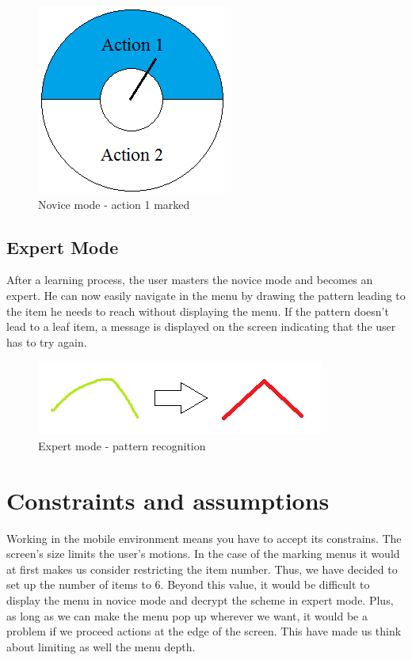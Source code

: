 \documentclass[conference]{IEEEtran}
\begin{document}
\begin{figure}[!ht] 
		\centering
		\includegraphics[scale = 0.5]{figure2.png} %
		\caption{Novice mode - action 1 marked}
		\label{linear-marking_menus}
\end{figure}

\subsection{Expert Mode}
After a learning process, the user masters the novice mode and becomes an expert. He can now easily navigate in the menu by drawing the pattern leading to the item he needs to reach without displaying the menu. If the pattern doesn't lead to a leaf item, a message is displayed on the screen indicating that the user has to try again.

\begin{figure}[!ht] 
		\centering
		\includegraphics[scale = 0.5]{figure3.png} %
		\caption{Expert mode - pattern recognition}
		\label{linear-marking_menus}
\end{figure}

\section{Constraints and assumptions}
Working in the mobile environment means you have to accept its constrains. The screen's size limits the user's motions. In the case of the marking menus it would at first makes us consider restricting the item number. Thus, we have decided to set up the number of items to 6. Beyond this value, it would be difficult to display the menu in novice mode and decrypt the scheme in expert mode. Plus, as long as we can make the menu pop up wherever we want, it would be a problem if we proceed actions at the edge of the screen. This have made us think about limiting as well the menu depth. 
\end{document}
